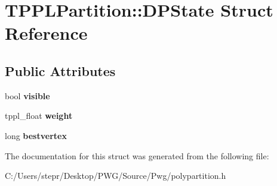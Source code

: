 \hypertarget{struct_t_p_p_l_partition_1_1_d_p_state}{}\section{T\+P\+P\+L\+Partition\+:\+:D\+P\+State Struct Reference}
\label{struct_t_p_p_l_partition_1_1_d_p_state}
\subsection*{Public Attributes}
\begin{DoxyCompactItemize}
\item 
\mbox{\label{struct_t_p_p_l_partition_1_1_d_p_state_a0d09f3721ef057c626c2e42fc5c26ca0}} 
bool {\bfseries visible}
\item 
\mbox{\label{struct_t_p_p_l_partition_1_1_d_p_state_afacc1e6ac2aa452abc0da7dbc4520f16}} 
tppl\+\_\+float {\bfseries weight}
\item 
\mbox{\label{struct_t_p_p_l_partition_1_1_d_p_state_acbded8153992cf351464f3a842c4d918}} 
long {\bfseries bestvertex}
\end{DoxyCompactItemize}


The documentation for this struct was generated from the following file\+:\begin{DoxyCompactItemize}
\item 
C\+:/\+Users/stepr/\+Desktop/\+P\+W\+G/\+Source/\+Pwg/polypartition.\+h\end{DoxyCompactItemize}
